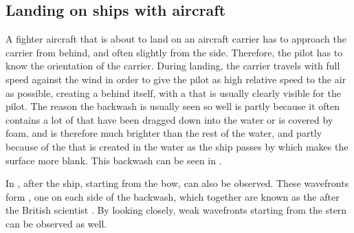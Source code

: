 \subsection{Landing on ships with aircraft}

A fighter aircraft that is about to land on an aircraft carrier has to approach the carrier from behind, and often slightly from the side. Therefore, the pilot has to know the orientation of the carrier. During landing, the carrier travels with full speed against the wind in order to give the pilot as high relative speed to the air as possible, creating a \wake behind itself, with a \backwash that is usually clearly visible for the pilot. The reason the backwash is usually seen so well is partly because it often contains a lot of  that have been dragged down into the water or is covered by foam, and is therefore much brighter than the rest of the water, and partly because of the \turbulence that is created in the water as the ship passes by which makes the surface more blank. This backwash can be seen in .

In ,  after the ship, starting from the bow, can also be observed. These wavefronts form , one on each side of the backwash, which together are known as the  after the British scientist . By looking closely, weak wavefronts starting from the stern can be observed as well.

